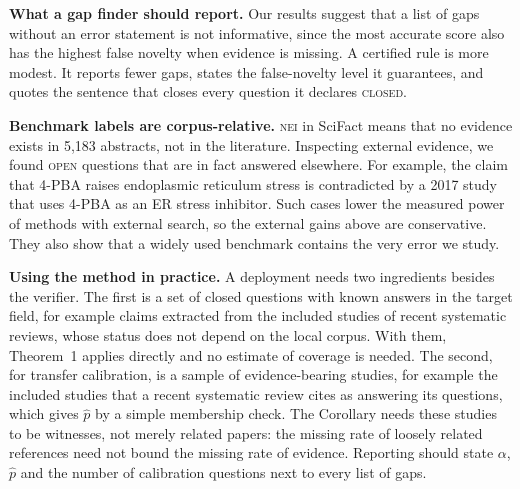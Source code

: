 \documentclass[conference,a4paper]{IEEEtran}
\theoremstyle{definition}
\newcommand{\open}{\textup{\textsc{open}}}
\newcommand{\closed}{\textup{\textsc{closed}}}
\begin{document}
\textbf{What a gap finder should report.} Our results suggest that a list of gaps without an error statement is not informative, since the most accurate score also has the highest false novelty when evidence is missing. A certified rule is more modest. It reports fewer gaps, states the false-novelty level it guarantees, and quotes the sentence that closes every question it declares \closed{}.

\textbf{Benchmark labels are corpus-relative.} \textsc{nei} in SciFact means that no evidence exists in 5,183 abstracts, not in the literature. Inspecting external evidence, we found \open{} questions that are in fact answered elsewhere. For example, the claim that 4-PBA raises endoplasmic reticulum stress is contradicted by a 2017 study that uses 4-PBA as an ER stress inhibitor. Such cases lower the measured power of methods with external search, so the external gains above are conservative. They also show that a widely used benchmark contains the very error we study.

\textbf{Using the method in practice.} A deployment needs two ingredients besides the verifier. The first is a set of closed questions with known answers in the target field, for example claims extracted from the included studies of recent systematic reviews, whose status does not depend on the local corpus. With them, Theorem~1 applies directly and no estimate of coverage is needed. The second, for transfer calibration, is a sample of evidence-bearing studies, for example the included studies that a recent systematic review cites as answering its questions, which gives $\hat p$ by a simple membership check. The Corollary needs these studies to be witnesses, not merely related papers: the missing rate of loosely related references need not bound the missing rate of evidence. Reporting should state $\alpha$, $\hat p$ and the number of calibration questions next to every list of gaps.
\end{document}
